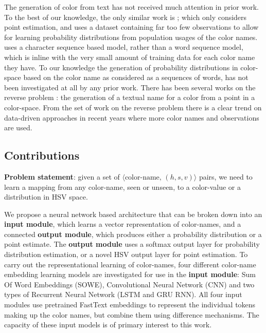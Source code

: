 \documentclass[]{clv3}
\newcommand{\parencite}{\citep}
\newcommand{\textcite}{\citet}
\newcommand{\datapairs}{$\langle\text{color-name},\,(h,s,v)\rangle$}
\begin{document}
The generation of color from text has not received much attention in prior work.
To the best of our knowledge, the only similar work is \textcite{DBLP:journals/corr/KawakamiDRS16};
which only considers point estimation,
and uses a dataset containing far too few observations to allow for learning probability distributions from population usages of the color names.
\textcite{DBLP:journals/corr/KawakamiDRS16} uses a character sequence based model, rather than a word sequence model, which is inline with the very small amount of training data for each color name they have.
To our knowledge the generation of probability distributions in color-space based on the color name as considered as a sequences of words, has not been investigated at all by any prior work.
There has been several works on the reverse problem \parencite{mcmahan2015bayesian,meomcmahanstone:color,2016arXiv160603821M}: the generation of a textual name for a color from a point in a color-space.
From the set of work on the reverse problem there is a clear trend on data-driven approaches in recent years where more color names and observations are used.




\subsection{Contributions}
{\bf Problem statement}: given a set of \datapairs{} pairs, we need to learn a mapping from any color-name, seen or unseen, to a color-value or a distribution in HSV space.

We propose a neural network based architecture that can be broken down into an 
\textbf{input module}, which learns a vector representation of color-names,
 and a connected \textbf{output module}, which produces either a probability distribution or a  point estimate.
The \textbf{output module} uses a softmax output layer for probability distribution estimation,
or a novel HSV output layer for point estimation. 
To carry out the representational learning of color-names, four different color-name embedding learning models are investigated for use in the \textbf{input module}: Sum Of Word Embeddings (SOWE), Convolutional Neural Network (CNN) and two types of Recurrent Neural Network (LSTM and GRU RNN).
All four input modules use pretrained FastText embeddings \parencite{bojanowski2016enriching} to represent the individual tokens making up the color names, but combine them using difference mechanisms.
The capacity of these input models is of primary interest to this work.
\end{document}
